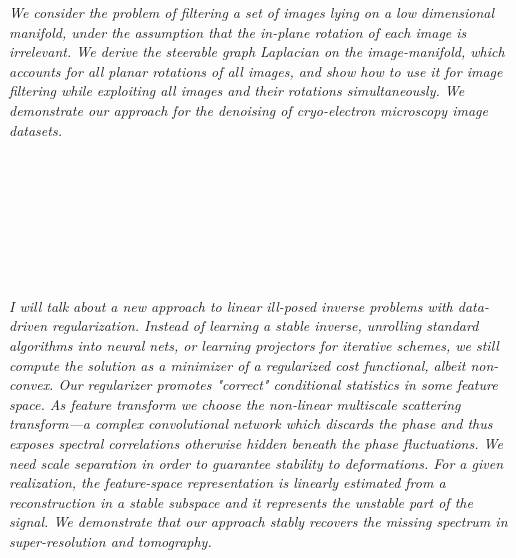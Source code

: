 \begin{multicols}{2}
\\ 
        \\
        \\\\
\\
      \textit{We consider the problem of filtering a set of images lying on a low dimensional manifold, under the assumption that the in-plane rotation of each image is irrelevant. We derive the steerable graph Laplacian on the image-manifold, which accounts for all planar rotations of all images, and show how to use it for image filtering while exploiting all images and their rotations simultaneously. We demonstrate our approach for the denoising of cryo-electron microscopy image datasets.}\\
\\ 
        \\
        \\\\
        \\
        \\\\
\\
      \textit{I will talk about a new approach to linear ill-posed inverse problems with data-driven regularization. Instead of learning a stable inverse, unrolling standard algorithms into neural nets, or learning projectors for iterative schemes, we still compute the solution as a minimizer of a regularized cost functional, albeit non-convex. Our regularizer promotes "correct" conditional statistics in some feature space. As feature transform we choose the non-linear multiscale scattering transform---a complex convolutional network which discards the phase and thus exposes spectral correlations otherwise hidden beneath the phase fluctuations. We need scale separation in order to guarantee stability to deformations. For a given realization, the feature-space representation is linearly estimated from a reconstruction in a stable subspace and it represents the unstable part of the signal. We demonstrate that our approach stably recovers the missing spectrum in super-resolution and tomography. }\\
\\ 
        \\
        \\\\
\\
\end{multicols}
